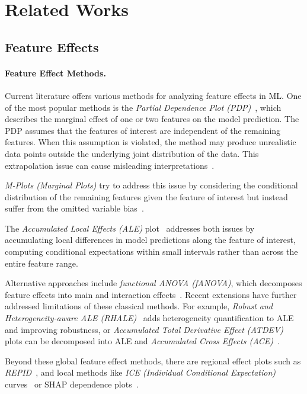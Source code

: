 \documentclass[runningheads]{llncs}
\begin{document}
\section{Related Works}\label{sec:related-works}

\subsection{Feature Effects}

\paragraph{Feature Effect Methods.}
Current literature offers various methods for analyzing feature effects in ML.
One of the most popular methods is the \textit{Partial Dependence Plot
    (PDP)}~\cite{friedman_greedy_2001}, which describes the marginal effect of one
or two features on the model prediction. The PDP assumes that the features of
interest are independent of the remaining features. When this assumption is
violated, the method may produce unrealistic data points outside the underlying
joint distribution of the data. This extrapolation issue can cause misleading
interpretations~\cite{molnar_interpretable_2022,molnar_general_2022}.

\textit{M-Plots (Marginal Plots)} try to address this issue by considering the
conditional distribution of the remaining features given the feature of interest
but instead suffer from the omitted variable
bias~\cite{apley_visualizing_2020,friedman_greedy_2001}.

The \textit{Accumulated Local Effects (ALE)} plot~\cite{apley_visualizing_2020}
addresses both issues by accumulating local differences in model predictions
along the feature of interest, computing conditional expectations within small
intervals rather than across the entire feature range.

Alternative approaches include \textit{functional ANOVA (fANOVA)}, which
decomposes feature effects into main and interaction
effects~\cite{hooker_discovering_2004}. Recent extensions have further
addressed limitations of these classical methods. For example, \textit{Robust
    and Heterogeneity-aware ALE (RHALE)}~\cite{gkolemis_rhale_2023} adds
heterogeneity quantification to ALE and improving robustness, or
\textit{Accumulated Total Derivative Effect (ATDEV)} plots can be decomposed
into ALE and \textit{Accumulated Cross Effects (ACE)}~\cite{liu_model_2018}.

Beyond these global feature effect methods, there are regional effect plots
such as \textit{REPID}~\cite{herbinger_repid_2022}, and local methods like
\textit{ICE (Individual Conditional Expectation)}
curves~\cite{goldstein_peeking_2015} or SHAP dependence
plots~\cite{lundberg_local_2020}.
\end{document}
